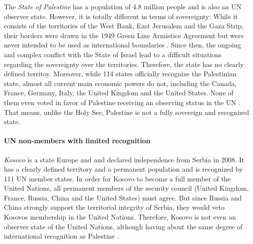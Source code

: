 The \emph{State of Palestine} has a population of 4.8 million people \cite[as of 2016]{PalestinePopulation} and is also an UN observer state. However, it is totally different in terms of sovereignty: While it consists of the territories of the West Bank, East Jerusalem and the Gaza Strip, their borders were drawn in the 1949 Green Line Armistice Agreement but were never intended to be used as international boundaries \cite{PalestineTerritory}. Since then, the ongoing and complex conflict with the State of Israel lead to a difficult situations regarding the sovereignty over the territories. Therefore, the state has no clearly defined territoy. Moreover, while 114 states officially recognize the Palestinian state, almost all current main economic powers do not, including the Canada, France, Germany, Italy, the United Kingdom and the United States. None of them even voted in favor of Palestine receiving an observing status in the UN \cite{PalestineUN}. That means, unlike the Holy See, Palestine is not a fully sovereign and recognized state.


\paragraph{UN non-members with limited recognition} %
\label{par:un_non_members_with_limited_recognition}

\emph{Kosovo} is a state Europe and and declared independence from Serbia in 2008. It has a clearly defined territory and a permanent population and is recognized by 111 UN member states. In order for Kosovo to become a full member of the United Nations, all permanent members of the security council (United Kingdom, France, Russia, China and the United States) must agree. But since Russia and China strongly support the territorial integrity of Serbia, they would veto Kosovos membership in the United Nations. Therefore, Kosovo is not even an observer state of the United Nations, although having about the same degree of international recognition as Palestine \cite{KosovoThanksYou}.

